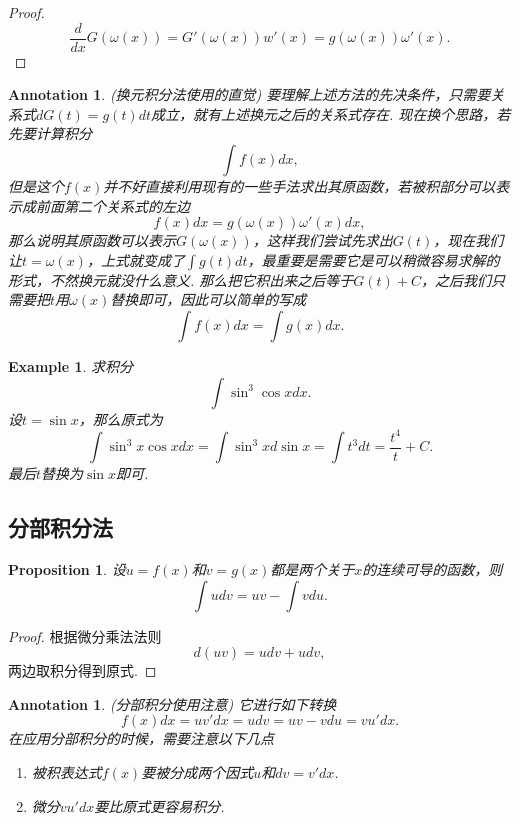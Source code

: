 \documentclass{article}
\newtheorem{proposition}[theorem]{Proposition}
\newtheorem{example}[theorem]{Example}
\newtheorem{annotation}[theorem]{Annotation}
\begin{document}
\begin{proof}
$$
\frac{d}{dx}G(\omega(x)) = G'(\omega(x))w'(x) = g(\omega(x))\omega'(x).
$$
\end{proof}

\begin{annotation}
\rm {\color{red} (换元积分法使用的直觉)} 要理解上述方法的先决条件，只需要关系式$dG(t)=g(t)dt$成立，就有上述换元之后的关系式存在. 现在换个思路，若先要计算积分
$$
\int f(x)dx,
$$
但是这个$f(x)$并不好直接利用现有的一些手法求出其原函数，若被积部分可以表示成前面第二个关系式的左边
$$
f(x)dx = g(\omega(x))\omega'(x)dx,
$$
那么说明其原函数可以表示$G(\omega(x))$，这样我们尝试先求出$G(t)$，现在我们让$t=\omega(x)$，上式就变成了$\int g(t)dt$，{\color{blue}最重要是需要它是可以稍微容易求解的形式，不然换元就没什么意义}. 那么把它积出来之后等于$G(t)+C$，之后我们只需要把$t$用$\omega(x)$替换即可，因此可以简单的写成
$$
\int f(x)dx = \int g(x)dx.
$$
\end{annotation}

\begin{example}
\rm 求积分
$$
\int \sin^3\cos xdx.
$$
设$t=\sin x$，那么原式为
$$
\int \sin^3x\cos xdx = \int \sin^3xd\sin x = \int t^3 dt = \frac{t^4}{t}+C.
$$
最后$t$替换为$\sin x$即可.
\end{example}

\subsection{分部积分法}

\begin{proposition}
\rm 设$u=f(x)$和$v=g(x)$都是两个关于$x$的连续可导的函数，则
$$
\int udv  = uv - \int vdu.
$$
\end{proposition}

\begin{proof}
根据微分乘法法则
$$
d(uv) = udv + udv,
$$
两边取积分得到原式.
\end{proof}

\begin{annotation}
\rm {\color{red} (分部积分使用注意)} 它进行如下转换
$$
f(x)dx = uv'dx = udv = uv-vdu = vu'dx.
$$
在应用分部积分的时候，需要注意以下几点
\begin{enumerate}
	\item 被积表达式$f(x)$要被分成两个因式$u$和$dv=v'dx$.
	\item 微分$vu'dx$要比原式更容易积分.
\end{enumerate}
\end{annotation}
\end{document}
